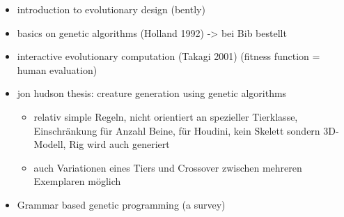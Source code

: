 \begin{itemize}
 \item introduction to evolutionary design (bently)
 \item basics on genetic algorithms (Holland 1992) -> bei Bib bestellt
 \item interactive evolutionary computation (Takagi 2001) (fitness function = human evaluation)
 \item jon hudson thesis: creature generation using genetic algorithms \cite{JonHudson}
   \begin{itemize}
    \item relativ simple Regeln, nicht orientiert an spezieller Tierklasse, Einschränkung für Anzahl Beine, für Houdini, kein Skelett sondern 3D-Modell, Rig wird auch generiert
    \item auch Variationen eines Tiers und Crossover zwischen mehreren Exemplaren möglich
   \end{itemize}
  \item Grammar based genetic programming (a survey) 
\end{itemize}


